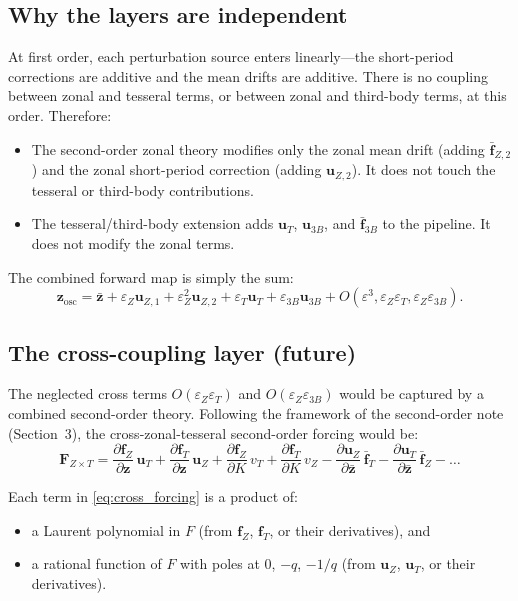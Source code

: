 \documentclass[11pt]{article}
\newcommand{\eps}{\varepsilon}
\begin{document}
\subsection{Why the layers are independent}

At first order, each perturbation source enters linearly---the
short-period corrections are additive and the mean drifts are additive.
There is no coupling between zonal and tesseral terms, or between zonal
and third-body terms, at this order. Therefore:
\begin{itemize}
\item The second-order zonal theory modifies only the zonal mean drift
(adding $\bar{\bm f}_{Z,2}$) and the zonal short-period correction
(adding $\bm u_{Z,2}$). It does not touch the tesseral or third-body
contributions.
\item The tesseral/third-body extension adds $\bm u_T$, $\bm u_{3B}$,
and $\bar{\bm f}_{3B}$ to the pipeline. It does not modify the zonal
terms.
\end{itemize}

The combined forward map is simply the sum:
\begin{equation}
\bm z_{\mathrm{osc}}
= \bar{\bm z}
+ \eps_Z \bm u_{Z,1}
+ \eps_Z^2 \bm u_{Z,2}
+ \eps_T \bm u_T
+ \eps_{3B} \bm u_{3B}
+ O(\eps^3, \eps_Z\eps_T, \eps_Z\eps_{3B}).
\end{equation}

\subsection{The cross-coupling layer (future)}

The neglected cross terms $O(\eps_Z \eps_T)$ and $O(\eps_Z \eps_{3B})$
would be captured by a combined second-order theory. Following the
framework of the second-order note (Section~3), the cross-zonal-tesseral
second-order forcing would be:
\begin{equation}
\bm F_{Z \times T}
= \frac{\partial \bm f_Z}{\partial \bm z}\,\bm u_T
+ \frac{\partial \bm f_T}{\partial \bm z}\,\bm u_Z
+ \frac{\partial \bm f_Z}{\partial K}\,v_T
+ \frac{\partial \bm f_T}{\partial K}\,v_Z
- \frac{\partial \bm u_Z}{\partial \bar{\bm z}}\,
  \bar{\bm f}_T
- \frac{\partial \bm u_T}{\partial \bar{\bm z}}\,
  \bar{\bm f}_Z
- \ldots
\label{eq:cross_forcing}
\end{equation}

Each term in \eqref{eq:cross_forcing} is a product of:
\begin{itemize}
\item a Laurent polynomial in $F$ (from $\bm f_Z$, $\bm f_T$, or their
derivatives), and
\item a rational function of $F$ with poles at $0$, $-q$, $-1/q$ (from
$\bm u_Z$, $\bm u_T$, or their derivatives).
\end{itemize}
\end{document}
